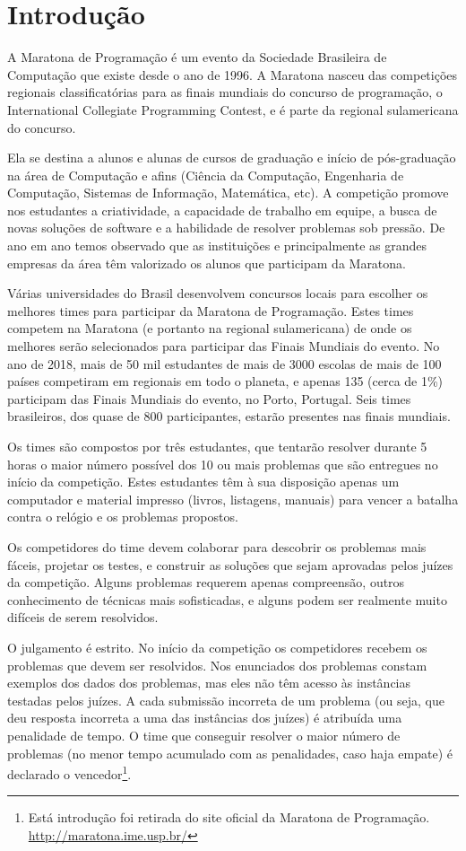 \newpage
\section{Introdução}
A Maratona de Programação é um evento da Sociedade Brasileira de Computação que existe desde o ano de 1996. A Maratona nasceu das competições regionais classificatórias para as finais mundiais do concurso de programação, o International Collegiate Programming Contest, e é parte da regional sulamericana do concurso.

Ela se destina a alunos e alunas de cursos de graduação e início de pós-graduação na área de Computação e afins (Ciência da Computação, Engenharia de Computação, Sistemas de Informação, Matemática, etc). A competição promove nos estudantes a criatividade, a capacidade de trabalho em equipe, a busca de novas soluções de software e a habilidade de resolver problemas sob pressão. De ano em ano temos observado que as instituições e principalmente as grandes empresas da área têm valorizado os alunos que participam da Maratona.

Várias universidades do Brasil desenvolvem concursos locais para escolher os melhores times para participar da Maratona de Programação. Estes times competem na Maratona (e portanto na regional sulamericana) de onde os melhores serão selecionados para participar das Finais Mundiais do evento. No ano de 2018, mais de 50 mil estudantes de mais de 3000 escolas de mais de 100 países competiram em regionais em todo o planeta, e apenas 135 (cerca de 1\%) participam das Finais Mundiais do evento, no Porto, Portugal. Seis times brasileiros, dos quase de 800 participantes, estarão presentes nas finais mundiais.

Os times são compostos por três estudantes, que tentarão resolver durante 5 horas o maior número possível dos 10 ou mais problemas que são entregues no início da competição. Estes estudantes têm à sua disposição apenas um computador e material impresso (livros, listagens, manuais) para vencer a batalha contra o relógio e os problemas propostos.

Os competidores do time devem colaborar para descobrir os problemas mais fáceis, projetar os testes, e construir as soluções que sejam aprovadas pelos juízes da competição. Alguns problemas requerem apenas compreensão, outros conhecimento de técnicas mais sofisticadas, e alguns podem ser realmente muito difíceis de serem resolvidos.

O julgamento é estrito. No início da competição os competidores recebem os problemas que devem ser resolvidos. Nos enunciados dos problemas constam exemplos dos dados dos problemas, mas eles não têm acesso às instâncias testadas pelos juízes. A cada submissão incorreta de um problema (ou seja, que deu resposta incorreta a uma das instâncias dos juízes) é atribuída uma penalidade de tempo. O time que conseguir resolver o maior número de problemas (no menor tempo acumulado com as penalidades, caso haja empate) é declarado o vencedor\footnote{Está introdução foi retirada do site oficial da Maratona de Programação. \url{http://maratona.ime.usp.br/}}. 


